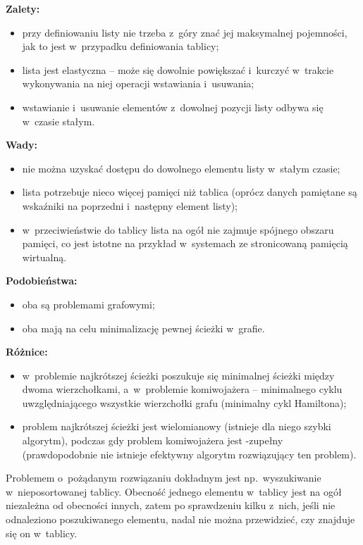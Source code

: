 \bigskip
\noindent\textbf{Zalety:}
\begin{itemize}
	\item przy definiowaniu listy nie trzeba z~góry znać jej maksymalnej pojemności, jak to jest w~przypadku definiowania tablicy;
	\item lista jest elastyczna -- może się dowolnie powiększać i~kurczyć w~trakcie wykonywania na niej operacji wstawiania i~usuwania;
	\item wstawianie i~usuwanie elementów z~dowolnej pozycji listy odbywa się w~czasie stałym.
\end{itemize}
\textbf{Wady:}
\begin{itemize}
	\item nie można uzyskać dostępu do dowolnego elementu listy w~stałym czasie;
	\item lista potrzebuje nieco więcej pamięci niż tablica (oprócz danych pamiętane są wskaźniki na poprzedni i~następny element listy);
	\item w~przeciwieństwie do tablicy lista na ogół nie zajmuje spójnego obszaru pamięci, co jest istotne na przykład w~systemach ze stronicowaną pamięcią wirtualną.
\end{itemize}

\exercise %
\noindent\textbf{Podobieństwa:}
\begin{itemize}
	\item oba są problemami grafowymi;
	\item oba mają na celu minimalizację pewnej ścieżki w~grafie.
\end{itemize}
\textbf{Różnice:}
\begin{itemize}
	\item w~problemie najkrótszej ścieżki poszukuje się minimalnej ścieżki między dwoma wierzchołkami, a~w~problemie komiwojażera -- minimalnego cyklu uwzględniającego wszystkie wierzchołki grafu (minimalny cykl Hamiltona);
	\item problem najkrótszej ścieżki jest wielomianowy (istnieje dla niego szybki algorytm), podczas gdy problem komiwojażera jest \NPclass-zupełny (prawdopodobnie nie istnieje efektywny algorytm rozwiązujący ten problem).
\end{itemize}

\exercise %
Problemem o~pożądanym rozwiązaniu dokładnym jest np.\ wyszukiwanie w~nieposortowanej tablicy. Obecność jednego elementu w~tablicy jest na ogół niezależna od obecności innych, zatem po sprawdzeniu kilku z~nich, jeśli nie odnaleziono poszukiwanego elementu, nadal nie można przewidzieć, czy znajduje się on w~tablicy.

